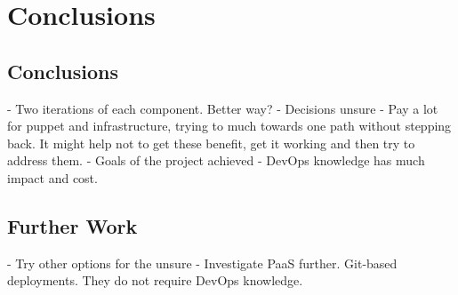 \chapter{Conclusions}

\section{Conclusions}

- Two iterations of each component. Better way?
- Decisions unsure
- Pay a lot for puppet and infrastructure, trying to much towards one path without stepping back. It might help not to get these benefit, get it working and then try to address them.
- Goals of the project achieved
- DevOps knowledge has much impact and cost.

\section{Further Work}

- Try other options for the unsure
- Investigate PaaS further. Git-based deployments. They do not require DevOps knowledge.